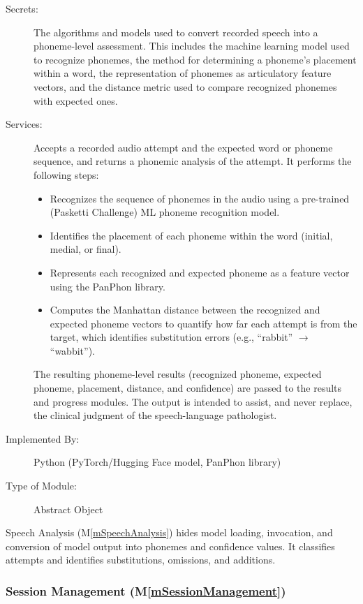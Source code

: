\documentclass[12pt, titlepage]{article}
\newcommand{\mref}[1]{M\ref{#1}}
\begin{document}
\begin{description}
\item[Secrets:] The algorithms and models used to convert recorded speech into
  a phoneme-level assessment. This includes the machine learning model used to
  recognize phonemes, the method for determining a phoneme's placement within
  a word, the representation of phonemes as articulatory feature vectors, and
  the distance metric used to compare recognized phonemes with expected ones.
\item[Services:] Accepts a recorded audio attempt and the expected word or
  phoneme sequence, and returns a phonemic analysis of the attempt. It
  performs the following steps:
  \begin{itemize}
  \item Recognizes the sequence of phonemes in the audio using a pre-trained (Pasketti Challenge)
    ML phoneme recognition model.
  \item Identifies the placement of each phoneme within the word (initial,
    medial, or final).
  \item Represents each recognized and expected phoneme as a feature vector
    using the PanPhon library.
  \item Computes the Manhattan distance between the recognized and expected
    phoneme vectors to quantify how far each attempt is from the target, which
    identifies substitution errors (e.g., ``rabbit'' $\rightarrow$
    ``wabbit'').
  \end{itemize}
  The resulting phoneme-level results (recognized phoneme, expected phoneme,
  placement, distance, and confidence) are passed to the results and progress
  modules. The output is intended to assist, and never replace, the clinical
  judgment of the speech-language pathologist.
\item[Implemented By:] Python (PyTorch/Hugging Face model, PanPhon library)
\item[Type of Module:] Abstract Object
\end{description}

Speech Analysis (\mref{mSpeechAnalysis}) hides model loading, invocation,
and conversion of model output into phonemes and confidence values. It
classifies attempts and identifies substitutions, omissions, and additions.

\subsubsection{Session Management (\mref{mSessionManagement})}
\end{document}
